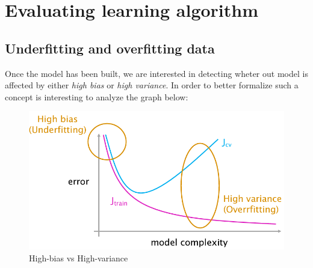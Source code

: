 \chapter{Evaluating learning algorithm}

\section{Underfitting and overfitting data}
Once the model has been built, we are interested in detecting wheter out model is affected by either \textit{high bias} or \textit{high variance}. In order to better formalize such a concept is interesting to analyze the graph below: 

\begin{figure}[h]
    \centering
    \includegraphics[scale=0.6]{img/bias_variance.png}
    \caption{High-bias vs High-variance}
\end{figure}

